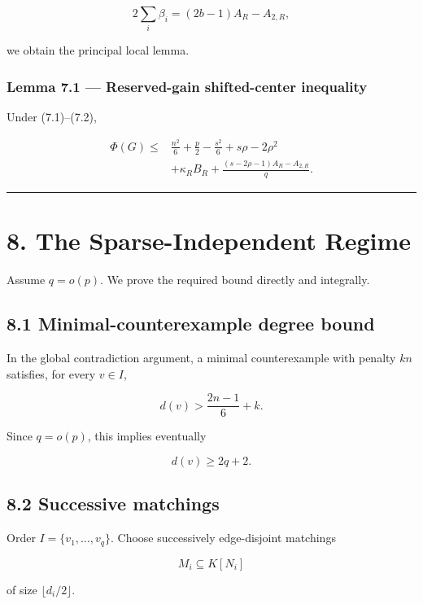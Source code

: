 \documentclass[11pt,a4paper]{article}
\begin{document}
\[
2\sum_i\beta_i
=(2b-1)A_R-A_{2,R},
\]

we obtain the principal local lemma.

\subsubsection{Lemma 7.1 --- Reserved-gain shifted-center inequality}\label{lemma-7.1-reserved-gain-shifted-center-inequality}

Under (7.1)--(7.2),

\[
\boxed{
\begin{aligned}
\Phi(G)
\le{}&
\frac{n^2}{6}+\frac p2-\frac{s^2}{6}
+s\rho-2\rho^2\\
&+
\kappa_RB_R
+
\frac{(s-2\rho-1)A_R-A_{2,R}}q.
\end{aligned}
}
\tag{7.6}
\]

\begin{center}\rule{0.5\linewidth}{0.5pt}\end{center}

\section{8. The Sparse-Independent Regime}\label{the-sparse-independent-regime}

Assume \(q=o(p)\). We prove the required bound directly and integrally.

\subsection{8.1 Minimal-counterexample degree bound}\label{minimal-counterexample-degree-bound}

In the global contradiction argument, a minimal counterexample with penalty \(kn\) satisfies, for every \(v\in I\),

\[
d(v)>
\frac{2n-1}{6}+k.
\tag{8.1}
\]

Since \(q=o(p)\), this implies eventually

\[
d(v)\ge2q+2.
\tag{8.2}
\]

\subsection{8.2 Successive matchings}\label{successive-matchings}

Order \(I=\{v_1,\ldots,v_q\}\). Choose successively edge-disjoint matchings

\[
M_i\subseteq K[N_i]
\]

of size \(\lfloor d_i/2\rfloor\).
\end{document}
